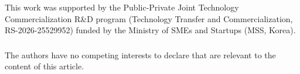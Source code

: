 \documentclass[a4paper]{llncs}
\begin{document}
\begin{credits}
\subsubsection{\ackname}
This work was supported by the Public-Private Joint Technology
Commercialization R\&D program (Technology Transfer and
Commercialization, RS-2026-25529952) funded by the Ministry of SMEs and
Startups (MSS, Korea).

\subsubsection{\discintname}
The authors have no competing interests to declare that are relevant to
the content of this article.
\end{credits}
\end{document}
